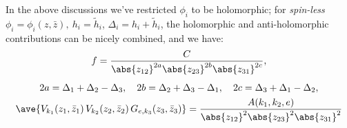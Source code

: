 \documentclass[a4paper,10pt]{article}
\begin{document}
\begin{enumerate}
\begin{enumerate}
	In the above discussions we've restricted $\phi_i$ to be holomorphic; for \textit{spin-less} $
		\phi_i = \phi_i(z,\bar{z}),\ %
		h_i = \tilde{h}_i$, $
		\Delta_i = h_i + \tilde{h}_i
	$, the holomorphic and anti-holomorphic contributions can be nicely combined, and we have:
	\begin{gather}
		f = \frac{C}{
			\abs{z_{12}}^{2a}
			\abs{z_{23}}^{2b}
			\abs{z_{31}}^{2c}
		},\\[1ex]
		2a = \Delta_1 + \Delta_2 - \Delta_3,\quad
		2b = \Delta_2 + \Delta_3 - \Delta_1,\quad
		2c = \Delta_3 + \Delta_1 - \Delta_2,\\
		\ave{
			V_{k_1}(z_1,\bar{z}_1)\,
			V_{k_2}(z_2,\bar{z}_2)\,
			G_{e,k_3}(z_3,\bar{z}_3)
		}
		= \frac{A(k_1,k_2,e)}{
			\abs{z_{12}}^{2}
			\abs{z_{23}}^{2}
			\abs{z_{31}}^{2}
		}
	\end{gather}
	

\end{enumerate}
\end{enumerate}
\end{document}

